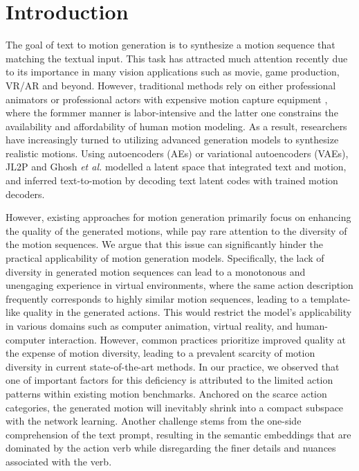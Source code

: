 \documentclass[letterpaper]{article} \usepackage{aaai24}
\begin{document}
\section{Introduction}
The goal of text to motion generation is to synthesize a motion sequence that matching the textual input.  This task has attracted much attention recently due to its importance in many vision applications such as movie, game production, VR/AR and beyond. 
However, traditional methods rely on either professional animators or professional actors with expensive motion capture equipment \cite{heloir2010exploiting, bradwell2008tutorial}, where the formmer manner is labor-intensive and the latter one constrains the availability and affordability of human motion modeling. As a result, researchers have increasingly turned to utilizing advanced generation models to synthesize realistic motions\cite{guo2022generating}. Using autoencoders (AEs) or variational autoencoders (VAEs), JL2P \cite{ahuja2019language2pose} and Ghosh \textit{et al.} \cite{ghosh2023synthesis} modelled a latent space that integrated text and motion, and inferred text-to-motion by decoding text latent codes with trained motion decoders.



However, existing approaches for motion generation primarily focus on enhancing the quality of the generated motions, while pay rare attention to  the diversity of the motion sequences. We argue that this issue can significantly hinder the practical applicability of motion generation models. Specifically, the lack of diversity in generated motion sequences can lead to a monotonous and unengaging experience in virtual environments, where the same action description frequently corresponds to highly similar motion sequences, leading to a template-like quality in the generated actions.  This would restrict the model's applicability in various domains such as computer animation, virtual reality, and human-computer interaction.  
However, common practices prioritize improved quality at the expense of motion diversity, leading to a prevalent scarcity of motion diversity in current state-of-the-art methods.
In our practice,  we observed that one of important factors for this deficiency is attributed to the limited action patterns within existing motion benchmarks.  Anchored on the scarce action categories, the generated motion will inevitably shrink into a compact subspace with the network learning. Another challenge stems from the one-side comprehension of the text prompt, resulting in the semantic embeddings that are dominated by the action verb while disregarding the finer details and nuances associated with the verb.
\end{document}
